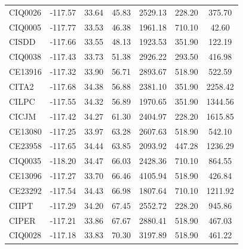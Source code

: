 \begin{table}[!ht]
{\begin{tabular}{@{}lcccccc@{}}
      CIQ0026   & -117.57           & 33.64             & 45.83           & 2529.13             & 228.20          & 375.70        \\
      CIQ0005   & -117.77           & 33.53             & 46.38           & 1961.18             & 710.10          & 42.60         \\
      CISDD     & -117.66           & 33.55             & 48.13           & 1923.53             & 351.90          & 122.19        \\
      CIQ0038   & -117.43           & 33.73             & 51.38           & 2926.22             & 293.50          & 416.98        \\
      CE13916   & -117.32           & 33.90             & 56.71           & 2893.67             & 518.90          & 522.59        \\
      CITA2     & -117.68           & 34.38             & 56.88           & 2381.10             & 351.90          & 2258.42       \\
      CILPC     & -117.55           & 34.32             & 56.89           & 1970.65             & 351.90          & 1344.56       \\
      CICJM     & -117.42           & 34.27             & 61.30           & 2404.97             & 228.20          & 1615.85       \\
      CE13080   & -117.25           & 33.97             & 63.28           & 2607.63             & 518.90          & 542.10        \\
      CE23958   & -117.65           & 34.44             & 63.85           & 2093.92             & 447.28          & 1236.29       \\
      CIQ0035   & -118.20           & 34.47             & 66.03           & 2428.36             & 710.10          & 864.55        \\
      CE13096   & -117.27           & 33.70             & 66.46           & 4105.94             & 518.90          & 426.84        \\
      CE23292   & -117.54           & 34.43             & 66.98           & 1807.64             & 710.10          & 1211.92       \\
      CIIPT     & -117.29           & 34.20             & 67.45           & 2552.72             & 228.20          & 945.86        \\
      CIPER     & -117.21           & 33.86             & 67.67           & 2880.41             & 518.90          & 467.03        \\
      CIQ0028   & -117.18           & 33.83             & 70.30           & 3197.89             & 518.90          & 461.22        \\

\end{tabular}}
\end{table}
